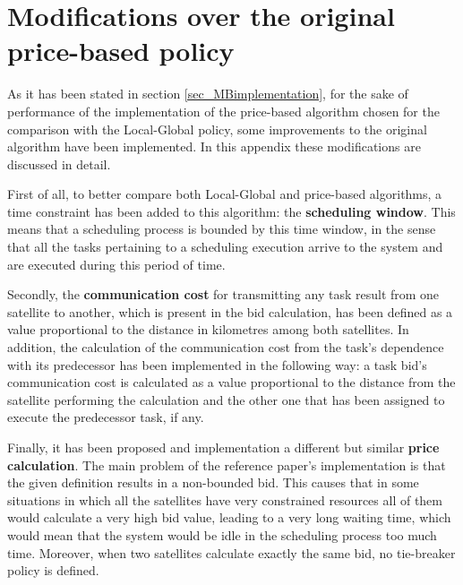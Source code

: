 
\chapter{Modifications over the original price-based policy} %

\label{AppendixA} %

As it has been stated in section \ref{sec_MBimplementation}, for the sake of performance of the implementation of the price-based algorithm chosen for the comparison with the Local-Global policy, some improvements to the original algorithm have been implemented. In this appendix these modifications are discussed in detail.

First of all, to better compare both Local-Global and price-based algorithms, a time constraint has been added to this algorithm: the \textbf{scheduling window}. This means that a scheduling process is bounded by this time window, in the sense that all the tasks pertaining to a scheduling execution arrive to the system and are executed during this period of time.

Secondly, the \textbf{communication cost} for transmitting any task result from one satellite to another, which is present in the bid calculation, has been defined as a value proportional to the distance in kilometres among both satellites. In addition, the calculation of the communication cost from the task's dependence with its predecessor has been implemented in the following way: a task bid's communication cost is calculated as a value proportional to the distance from the satellite performing the calculation and the other one that has been assigned to execute the predecessor task, if any.

Finally, it has been proposed and implementation a different but similar \textbf{price calculation}. The main problem of the reference paper's implementation is that the given definition results in a non-bounded bid. This causes that in some situations in which all the satellites have very constrained resources all of them would calculate a very high bid value, leading to a very long waiting time, which would mean that the system would be idle in the scheduling process too much time. Moreover, when two satellites calculate exactly the same bid, no tie-breaker policy is defined.

